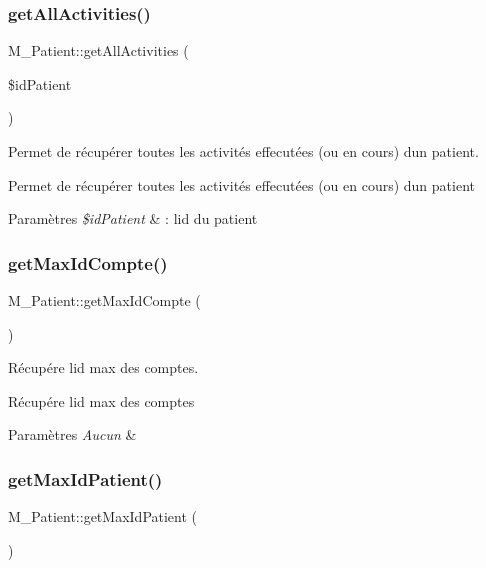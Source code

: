 \subsubsection{\texorpdfstring{get\+All\+Activities()}{getAllActivities()}}
{\footnotesize\ttfamily M\+\_\+\+Patient\+::get\+All\+Activities (\begin{DoxyParamCaption}\item[{}]{\$id\+Patient }\end{DoxyParamCaption})}



Permet de récupérer toutes les activités effecutées (ou en cours) d\textquotesingle{}un patient. 

Permet de récupérer toutes les activités effecutées (ou en cours) d\textquotesingle{}un patient 
\begin{DoxyParams}{Paramètres}
{\em \$id\+Patient} & \+: l\textquotesingle{}id du patient \\
\hline
\end{DoxyParams}
\mbox{\label{class_m___patient_ad46c826cf873513020c2a38c4955f55c}} 
\subsubsection{\texorpdfstring{get\+Max\+Id\+Compte()}{getMaxIdCompte()}}
{\footnotesize\ttfamily M\+\_\+\+Patient\+::get\+Max\+Id\+Compte (\begin{DoxyParamCaption}{ }\end{DoxyParamCaption})}



Récupére l\textquotesingle{}id max des comptes. 

Récupére l\textquotesingle{}id max des comptes 
\begin{DoxyParams}{Paramètres}
{\em Aucun} & \\
\hline
\end{DoxyParams}
\mbox{\label{class_m___patient_ae78fc7c3ec0e22745e48533c903ecd04}} 
\subsubsection{\texorpdfstring{get\+Max\+Id\+Patient()}{getMaxIdPatient()}}
{\footnotesize\ttfamily M\+\_\+\+Patient\+::get\+Max\+Id\+Patient (\begin{DoxyParamCaption}{ }\end{DoxyParamCaption})}



